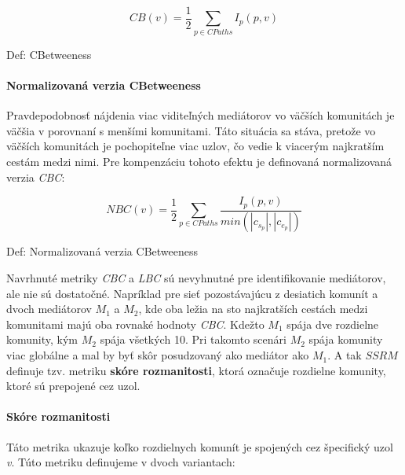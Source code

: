 \documentclass[slovak,master,public,dept460,male,cpdeclaration,oneside]{diploma}
\begin{document}
\begin{mycapequ}[!ht]
   \begin{equation*}
    CB(v) = \frac{1}{2} \sum_{p \in CPaths} I_{p}(p, v)
   \end{equation*}
   \caption{Def: CBetweeness}
\end{mycapequ}


\paragraph{Normalizovaná verzia CBetweeness}
\hfill \break
Pravdepodobnosť nájdenia viac viditeľných mediátorov vo väčších komunitách je väčšia v porovnaní s menšími komunitami. Táto situácia sa stáva, pretože vo väčších komunitách je pochopiteľne viac uzlov, čo vedie k viacerým najkratším cestám medzi nimi. Pre kompenzáciu tohoto efektu je definovaná normalizovaná verzia \textit{CBC}: 


\begin{mycapequ}[!ht]
   \begin{equation*}
    NBC(v) = \frac{1}{2} \sum_{p \in CPaths} \frac{I_{p}(p, v)}{min(|c_{s_{p}}|,|c_{e_{p}}|)}
   \end{equation*}
   \caption{Def: Normalizovaná verzia CBetweeness}
\end{mycapequ}




\begin{sloppypar}
Navrhnuté metriky \textit{CBC} a \textit{LBC} sú nevyhnutné pre identifikovanie mediátorov, ale nie sú dostatočné. Napríklad pre sieť pozostávajúcu z desiatich komunít a dvoch mediátorov \textit{${M_1}$}
a \textit{${M_2}$}, kde oba ležia na sto najkratších cestách medzi komunitami majú oba rovnaké hodnoty \textit{CBC}. Kdežto \textit{${M_1}$} spája dve rozdielne komunity, kým \textit{${M_2}$} spája všetkých 10. Pri takomto scenári \textit{${M_2}$} spája komunity viac globálne a mal by byť skôr posudzovaný ako mediátor ako \textit{${M_1}$}. A tak \textit{${SSRM}$} definuje tzv. metriku \textbf{skóre rozmanitosti}, ktorá označuje rozdielne komunity, ktoré sú prepojené cez uzol.
\end{sloppypar}


\paragraph{Skóre rozmanitosti}
\hfill \break
Táto metrika ukazuje koľko rozdielnych komunít je spojených cez špecifický uzol \textit{v}. Túto metriku definujeme v dvoch variantach:
\end{document}
